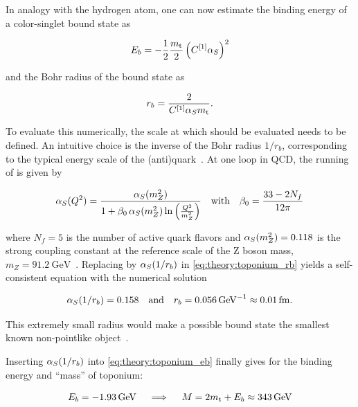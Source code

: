 In analogy with the hydrogen atom, one can now estimate the binding energy of a color-singlet \ttbar bound state as~\cite{Fadin:1987,Fabiano:1994cz,Maltoni:LHCTopWG}

\begin{equation}
\label{eq:theory:toponium_eb}
  E_b = -\frac{1}{2} \frac{m_{\mathrm{t}}}{2} \left( C^{[1]} \alpha_S \right)^2
\end{equation}

\noindent and the Bohr radius of the bound state as

\begin{equation}
\label{eq:theory:toponium_rb}
  r_b = \frac{2} {C^{[1]} \alpha_S m_{\mathrm{t}}} .
\end{equation}

To evaluate this numerically, the scale at which \alphas should be evaluated needs to be defined. An intuitive choice is the inverse of the Bohr radius $1/r_b$, corresponding to the typical energy scale of the (anti)quark~\cite{Kiyo:2008bv,Maltoni:LHCTopWG}. At one loop in QCD, the running of \alphas is given by~\cite{Schwartz:2014sze}

\begin{equation}
  \alpha_S (Q^2) = \frac{\alpha_S(m_Z^2)}{ 1 + \beta_0 \, \alpha_S(m_Z^2) \ln \left( \frac{Q^2}{m_Z^2} \right)} \quad \text{with} \quad \beta_0 = \frac{33 - 2 N_f}{12 \pi}
\end{equation}

\noindent where $N_f = 5$ is the number of active quark flavors and $\alpha_S(m_Z^2) = 0.118$ is the strong coupling constant at the reference scale of the Z boson mass, $m_Z = \SI{91.2}{\GeV}$~\cite{PDG:2022pth}.
Replacing \alphas by $\alpha_S(1/r_b)$ in \cref{eq:theory:toponium_rb} yields a self-consistent equation with the numerical solution

\begin{equation}
\label{eq:theory:alphas_toponium}
  \alphas(1/r_b) = 0.158 \quad \text{and} \quad r_b = \SI{0.056}{\per\GeV} \approx \SI{0.01}{\femto\meter} .
\end{equation}

This extremely small radius would make a possible \ttbar bound state the smallest known non-pointlike object~\cite{Fu:2025yft}.

Inserting $\alpha_S(1/r_b)$ into \cref{eq:theory:toponium_eb} finally gives for the binding energy and ``mass'' of toponium:

\begin{equation}
\label{eq:theory:toponium_eb_num}
  E_b = - \SI{1.93}{\GeV} \quad \implies \quad M = 2 \mt + E_b \approx \SI{343}{\GeV}
\end{equation}

